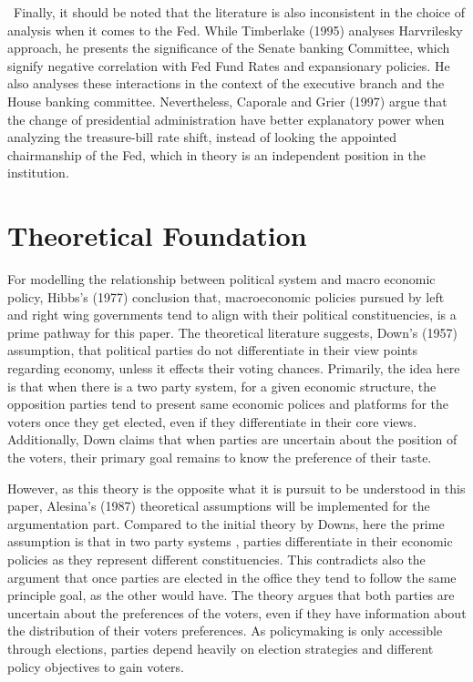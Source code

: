 \documentclass[11pt]{article}
\begin{document}
\ Finally, it should be noted that the literature is also inconsistent in the choice of analysis when it comes to the Fed. While Timberlake (1995) analyses Harvrilesky approach, he presents the significance of the Senate banking Committee, which signify negative correlation with Fed Fund Rates and expansionary policies. He also analyses these interactions in the context of the executive branch and the House banking committee. Nevertheless, Caporale and Grier (1997) argue that the change of presidential administration have better explanatory power when analyzing the treasure-bill rate shift, instead of looking the appointed chairmanship of the Fed, which in theory is an independent position in the institution.

\section{Theoretical Foundation}

For modelling the relationship between political system and macro economic policy,  Hibbs's (1977) conclusion that, macroeconomic policies pursued by left and right wing governments tend to align with their political constituencies, is a prime pathway for this paper. The theoretical literature suggests, Down's (1957) assumption, that political parties do not differentiate in their view points regarding economy, unless it effects their voting chances. Primarily, the idea here is that when there is a two party system, for a given economic structure, the opposition parties tend to present same economic polices and platforms for the voters once they get elected, even if they differentiate in their core views. Additionally, Down claims that when parties are uncertain about the position of the voters, their primary goal remains to know the preference of their taste.\

However, as this theory is the opposite what it is pursuit to be understood in this paper, Alesina's (1987) theoretical assumptions will be implemented for the argumentation part. Compared to the initial theory by Downs, here the prime assumption is that in two party systems , parties differentiate in their economic policies as they represent different constituencies. This contradicts also the argument that once parties are elected in the office they tend to follow the same principle goal, as the other would have. The theory argues that both parties are uncertain about the preferences of the voters, even if they have information about the distribution of their voters preferences. As policymaking is only accessible through elections, parties  depend heavily on election strategies and different policy objectives to gain voters.
\
\end{document}
